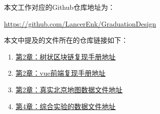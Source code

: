 \begin{appendices}
本文工作对应的Github仓库地址为：

\href{https://github.com/LancerEnk/GraduationDesign}{https://github.com/LancerEnk/GraduationDesign}

本文中提及的文件所在的仓库链接如下：
\begin{enumerate}
    \item \href{https://github.com/LancerEnk/GraduationDesign/blob/main/doc/\%E5\%A4\%8D\%E7\%8E\%B0\%E6\%89\%8B\%E5\%86\%8C/10\%20\%E9\%83\%A8\%E7\%BD\%B2\%E5\%9C\%A8geth-tree\%E4\%B8\%8A\%E7\%9A\%84\%E5\%87\%BA\%E7\%A7\%9F\%E8\%BD\%A6\%E8\%B0\%83\%E5\%BA\%A6\%E7\%B3\%BB\%E7\%BB\%9F\%E5\%A4\%8D\%E7\%8E\%B0\%E5\%AE\%9E\%E9\%AA\%8C.md}{第2章：树状区块链复现手册地址}
    \item \href{https://github.com/LancerEnk/GraduationDesign/blob/main/doc/\%E5\%A4\%8D\%E7\%8E\%B0\%E6\%89\%8B\%E5\%86\%8C/vue\%E5\%A4\%8D\%E7\%8E\%B0.md}{第2章：vue前端复现手册地址}
    \item \href{https://github.com/LancerEnk/GraduationDesign/tree/main/fuxian/mapData/RealBjMap}{第2章：真实北京地图数据文件地址}
    \item \href{https://github.com/LancerEnk/GraduationDesign/tree/main/src/0521data}{第4章：综合实验的数据文件地址}
\end{enumerate}

\end{appendices}